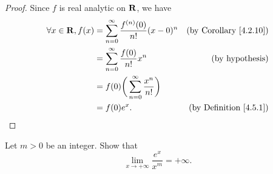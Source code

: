 \begin{proof}
    Since \(f\) is real analytic on \(\mathbf{R}\), we have
    \begin{align*}
        \forall x \in \mathbf{R}, f(x) & = \sum_{n = 0}^\infty \frac{f^{(n)}(0)}{n!} (x - 0)^n & \text{(by Corollary \ref{4.2.10})} \\
                               & = \sum_{n = 0}^\infty \frac{f(0)}{n!} x^n             & \text{(by hypothesis)}             \\
                               & = f(0) \bigg(\sum_{n = 0}^\infty \frac{x^n}{n!}\bigg)                                      \\
                               & = f(0) e^x.                                           & \text{(by Definition \ref{4.5.1})}
    \end{align*}
\end{proof}

\begin{exercise}\label{ex 4.5.8}
    Let \(m > 0\) be an integer.
    Show that
    \[
        \lim_{x \to +\infty} \frac{e^x}{x^m} = +\infty.
    \]
\end{exercise}

